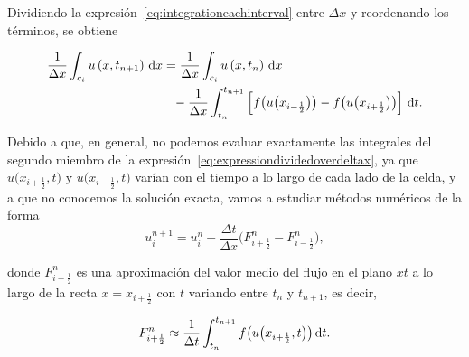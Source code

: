 \begin{frame}
    \frametitle{\secname}

    Dividiendo la expresión~\eqref{eq:integrationeachinterval} entre
    $\Delta x$ y reordenando los términos, se obtiene

    \begin{gather}\label{eq:expressiondividedoverdeltax}
        \begin{split}
            \frac{1}{\Delta x}
            \int_{c_{i}}
            u
            \left(x,t_{n+1}\right)
            \dl x
             & =
            \frac{1}{\Delta x}
            \int_{c_{i}}
            u
            \left(x,t_{n}\right)
            \dl x          \\
             & \phantom{=}
            -\frac{1}{\Delta x}
            \int_{t_{n}}^{t_{n+1}}
            \left[
                f
                \big(
                u\big(x_{i-\frac{1}{2}}\big)
                \big)-
                f
                \big(
                u\big(x_{i+\frac{1}{2}}\big)
                \big)
                \right]
            \dl t.
        \end{split}
    \end{gather}

    Debido a que, en general, no podemos evaluar exactamente las
    integrales del segundo miembro de la
    expresión~\eqref{eq:expressiondividedoverdeltax}, ya que
    \begin{math}
        u
        \big(x_{i+\frac{1}{2}},t\big)
    \end{math}
    y
    \begin{math}
        u
        \big(x_{i-\frac{1}{2}},t\big)
    \end{math}
    varían con el
    tiempo a lo largo de cada lado de la celda, y a que no conocemos la
    solución exacta, vamos a estudiar métodos numéricos de la forma
    \begin{equation}\label{eq:godunovscheme}
        u^{n+1}_{i}=
        u^{n}_{i}-
        \frac{\Delta t}{\Delta x}
        \big(
        F^{n}_{i+\frac{1}{2}}-
        F^{n}_{i-\frac{1}{2}}
        \big),
    \end{equation}

    donde $F^{n}_{i+\frac{1}{2}}$ es una aproximación del valor medio del
    flujo en el plano $xt$ a lo largo de la recta $x=x_{i+\frac{1}{2}}$
    con $t$ variando entre $t_{n}$ y $t_{n+1}$, es decir,

    \begin{equation}\label{eq:numericalflux}
        F^{n}_{i+\frac{1}{2}}\approx
        \frac{1}{\Delta t}
        \int_{t_{n}}^{t_{n+1}}
        f
        \big(
        u
        \big(x_{i+\frac{1}{2}},t\big)
        \big)
        \dl t.
    \end{equation}
\end{frame}


